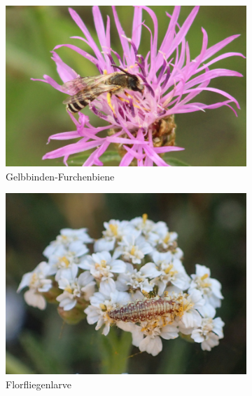 \documentclass[10pt]{article}
\begin{document}
\begin{figure}[h!]
  \centering
  \begin{subfigure}[b]{0.47\linewidth}
    \includegraphics[width=\linewidth]{img/bogen/wildbiene.jpg}
    \caption{Gelbbinden-Furchenbiene}
  \end{subfigure}
  \begin{subfigure}[b]{0.42\linewidth}
    \includegraphics[width=\linewidth]{img/bogen/florfliegenlarve.jpg}
    \caption{Florfliegenlarve}
  \end{subfigure}
  \begin{subfigure}[b]{0.44\linewidth}

\end{subfigure}
\end{figure}
\end{document}
